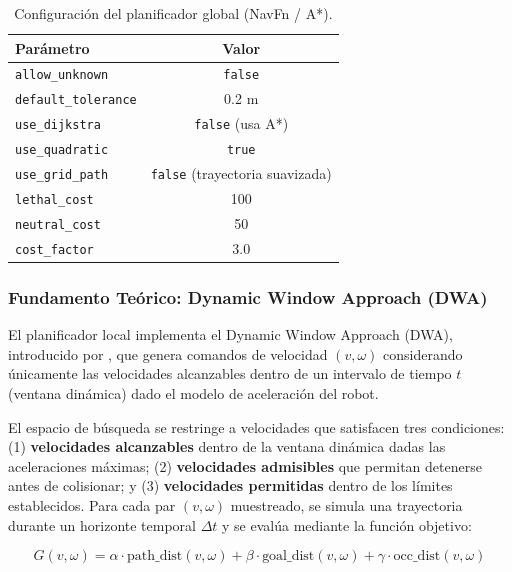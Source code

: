 \documentclass[12pt,letterpaper]{article}
\begin{document}
\begin{table}[H]
    \centering
    \caption{Configuración del planificador global (NavFn / A*).}
    \label{tab:global_planner}
    \begin{tabular}{lc}
        \hline
        \textbf{Parámetro} & \textbf{Valor} \\
        \hline
        \texttt{allow\_unknown} & \texttt{false} \\
        \texttt{default\_tolerance} & 0.2 m \\
        \texttt{use\_dijkstra} & \texttt{false} (usa A*) \\
        \texttt{use\_quadratic} & \texttt{true} \\
        \texttt{use\_grid\_path} & \texttt{false} (trayectoria suavizada) \\
        \texttt{lethal\_cost} & 100 \\
        \texttt{neutral\_cost} & 50 \\
        \texttt{cost\_factor} & 3.0 \\
        \hline
    \end{tabular}
\end{table}

\subsubsection{Fundamento Teórico: Dynamic Window Approach (DWA)}

El planificador local implementa el Dynamic Window Approach (DWA), introducido por \citet{fox1997dynamic}, que genera comandos de velocidad $(v, \omega)$ considerando únicamente las velocidades alcanzables dentro de un intervalo de tiempo $t$ (ventana dinámica) dado el modelo de aceleración del robot.

El espacio de búsqueda se restringe a velocidades que satisfacen tres condiciones: (1) \textbf{velocidades alcanzables} dentro de la ventana dinámica dadas las aceleraciones máximas; (2) \textbf{velocidades admisibles} que permitan detenerse antes de colisionar; y (3) \textbf{velocidades permitidas} dentro de los límites establecidos. Para cada par $(v, \omega)$ muestreado, se simula una trayectoria durante un horizonte temporal $\Delta t$ y se evalúa mediante la función objetivo:

\begin{equation}
    G(v, \omega) = \alpha \cdot \text{path\_dist}(v, \omega) + \beta \cdot \text{goal\_dist}(v, \omega) + \gamma \cdot \text{occ\_dist}(v, \omega)
    \label{eq:dwa}
\end{equation}
\end{document}
